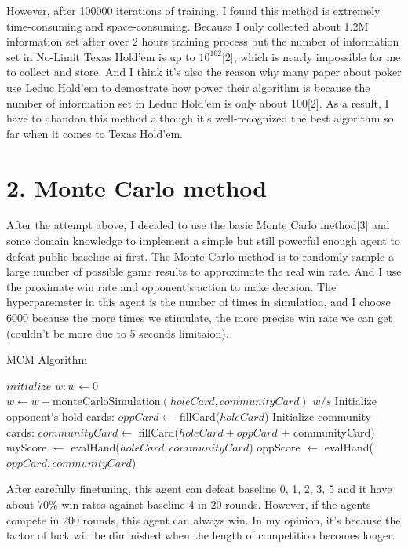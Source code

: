 \documentclass[11pt,a4paper]{article}
\begin{document}
However, after 100000 iterations of training, I found this method is extremely time-consuming and space-consuming.
Because I only collected about 1.2M information set after over 2 hours training process but the number of information set in No-Limit Texas Hold'em is up to $10^{162}$[2],
which is nearly impossible for me to collect and store. And I think it's also the reason why many paper about poker use Leduc Hold'em to demostrate how power their algorithm is because
the number of information set in Leduc Hold'em is only about 100[2]. As a result, I have to abandon this method although it's well-recognized the best algorithm so far when it comes to Texas Hold'em.

\section*{2. Monte Carlo method}
After the attempt above, I decided to use the basic Monte Carlo method[3] and some domain knowledge to implement a simple but still powerful enough agent to defeat public baseline ai first. 
The Monte Carlo method is to randomly sample a large number of possible game results to approximate the real win rate. And I use the proximate win rate and opponent's action to
make decision. The hyperparemeter in this agent is the number of times in simulation, and I choose 6000 because the more times we stimulate, the more precise win rate we can get
(couldn't be more due to 5 seconds limitaion).
\begin{algorithm}
    \caption{MCM Algorithm}\label{euclid}
    \begin{algorithmic}[1]
            \State $\textit{initialize }w:w\gets 0$
                \State $w \gets w + \text{monteCarloSimulation}(holeCard, communityCard)$
            \EndFor
            \State \Return $w/s$
        \EndFunction
        \State Initialize opponent's hold cards: $oppCard \gets$ fillCard($holeCard$)
        \State Initialize community cards: $communityCard \gets$ fillCard($holeCard+oppCard$ + communityCard)
        \State myScore $\gets$ evalHand($holeCard, communityCard$)
        \State oppScore $\gets$ evalHand($oppCard, communityCard$)
        \State {}
        \EndIf
        \State {}
        \EndFunction
    \end{algorithmic}
\end{algorithm}
After carefully finetuning, this agent can defeat baseline 0, 1, 2, 3, 5 and it have about 70\% win rates against baseline 4 in 20 rounds.
However, if the agents compete in 200 rounds, this agent can always win. In my opinion, it's because the factor of luck will be diminished when the length of competition
becomes longer.
\end{document}
